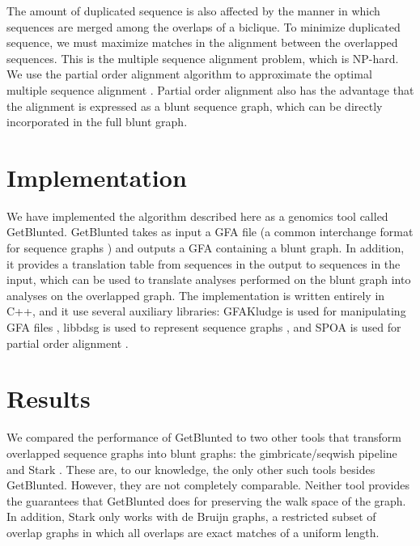 \documentclass[11pt]{ucthesis}
\begin{document}
The amount of duplicated sequence is also affected by the manner in which sequences are merged among the overlaps of a biclique.
To minimize duplicated sequence, we must maximize matches in the alignment between the overlapped sequences.
This is the multiple sequence alignment problem, which is NP-hard.
We use the partial order alignment algorithm to approximate the optimal multiple sequence alignment \cite{lee2002multiple}.
Partial order alignment also has the advantage that the alignment is expressed as a blunt sequence graph, which can be directly incorporated in the full blunt graph.

\section{Implementation}

We have implemented the algorithm described here as a genomics tool called GetBlunted.
GetBlunted takes as input a GFA file (a common interchange format for sequence graphs \cite{gfaspec}) and outputs a GFA containing a blunt graph.
In addition, it provides a translation table from sequences in the output to sequences in the input, which can be used to translate analyses performed on the blunt graph into analyses on the overlapped graph.
The implementation is written entirely in C++, and it use several auxiliary libraries: GFAKludge is used for manipulating GFA files \cite{dawson2019gfakluge}, libbdsg is used to represent sequence graphs \cite{eizenga2020efficient}, and SPOA is used for partial order alignment \cite{vaser2017fast}.

\section{Results}


We compared the performance of GetBlunted to two other tools that transform overlapped sequence graphs into blunt graphs: the gimbricate/seqwish \cite{garrison_ekggimbricate_2020,garrison_ekgseqwish_2021} pipeline and Stark \cite{nikaein_hnikaeinstark_2021}. 
These are, to our knowledge, the only other such tools besides GetBlunted.
However, they are not completely comparable.
Neither tool provides the guarantees that GetBlunted does for preserving the walk space of the graph.
In addition, Stark only works with de Bruijn graphs, a restricted subset of overlap graphs in which all overlaps are exact matches of a uniform length.
\end{document}
